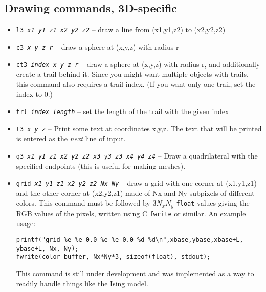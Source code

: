 \documentclass[12pt]{article}
\begin{document}
\subsection{Drawing commands, 3D-specific}
\begin{itemize}

\item {\tt l3 {\it x1 y1 z1 x2 y2 z2}} -- draw a line from (x1,y1,z2) to (x2,y2,z2)
\item {\tt c3 {\it x y z r}} -- draw a sphere at (x,y,z) with radius r
\item {\tt ct3 {\it index x y z r}} -- draw a sphere at (x,y,z) with radius r, and additionally create a trail behind it. Since you might want 
  multiple objects with trails, this command also requires a trail index. (If you want only one trail, set the index to 0.)
\item {\tt trl {\it index length}} -- set the length of the trail with the given index
\item {\tt t3 {\it x y z}} -- Print some text at coordinates x,y,z. The text that will be printed is entered as the {\it next} line of input.
\item {\tt q3 {\it x1 y1 z1 x2 y2 z2 x3 y3 z3 x4 y4 z4}} -- Draw a quadrilateral with the specified endpoints (this is useful for making meshes). 
\item {\tt grid {\it x1 y1 z1 x2 y2 z2 Nx Ny}} -- draw a grid with one corner at (x1,y1,z1) and the other corner at (x2,y2,z1) made of Nx and Ny subpixels of different colors. This command must be followed by $3 N_x N_y$ {\tt float} values giving the RGB values of the pixels, written using C {\tt fwrite} or similar. An example usage:

\begin{verbatim}
printf("grid %e %e 0.0 %e %e 0.0 %d %d\n",xbase,ybase,xbase+L, ybase+L, Nx, Ny);
fwrite(color_buffer, Nx*Ny*3, sizeof(float), stdout);
\end{verbatim}

This command is still under development and was implemented as a way to readily handle things like the Ising model.

\end{itemize}
\end{document}
